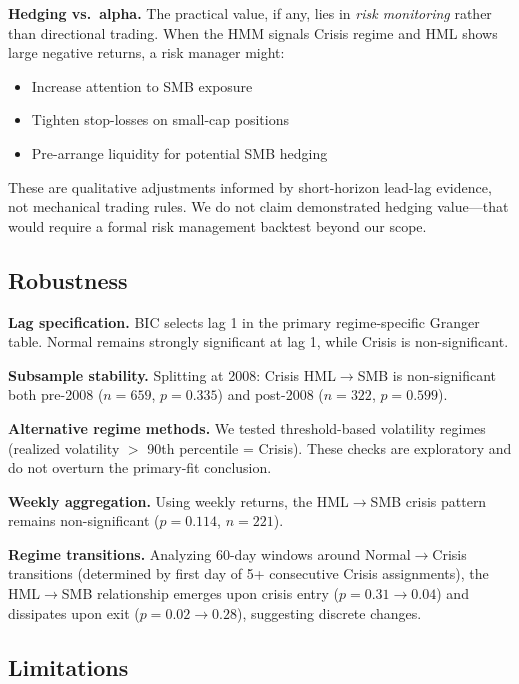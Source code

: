 \documentclass[sigconf]{acmart}
\begin{document}
\textbf{Hedging vs.\ alpha.} The practical value, if any, lies in \emph{risk monitoring}
rather than directional trading. When the HMM signals Crisis regime and HML shows
large negative returns, a risk manager might:
\begin{itemize}
    \item Increase attention to SMB exposure
    \item Tighten stop-losses on small-cap positions
    \item Pre-arrange liquidity for potential SMB hedging
\end{itemize}

These are qualitative adjustments informed by short-horizon lead-lag evidence, not mechanical
trading rules. We do not claim demonstrated hedging value---that would require
a formal risk management backtest beyond our scope.

\subsection{Robustness}

\textbf{Lag specification.} BIC selects lag 1 in the primary regime-specific
Granger table. Normal remains strongly significant at lag 1, while Crisis is
non-significant.

\textbf{Subsample stability.} Splitting at 2008: Crisis HML$\to$SMB is
non-significant both pre-2008 ($n = 659$, $p = 0.335$) and post-2008
($n = 322$, $p = 0.599$).

\textbf{Alternative regime methods.} We tested threshold-based volatility regimes
(realized volatility $>$ 90th percentile = Crisis). These checks are exploratory
and do not overturn the primary-fit conclusion.

\textbf{Weekly aggregation.} Using weekly returns, the HML$\to$SMB crisis pattern
remains non-significant ($p = 0.114$, $n = 221$).

\textbf{Regime transitions.} Analyzing 60-day windows around Normal$\to$Crisis
transitions (determined by first day of 5+ consecutive Crisis assignments),
the HML$\to$SMB relationship emerges upon crisis entry ($p = 0.31 \to 0.04$)
and dissipates upon exit ($p = 0.02 \to 0.28$), suggesting discrete changes.

\subsection{Limitations}
\label{sec:limitations}
\end{document}
